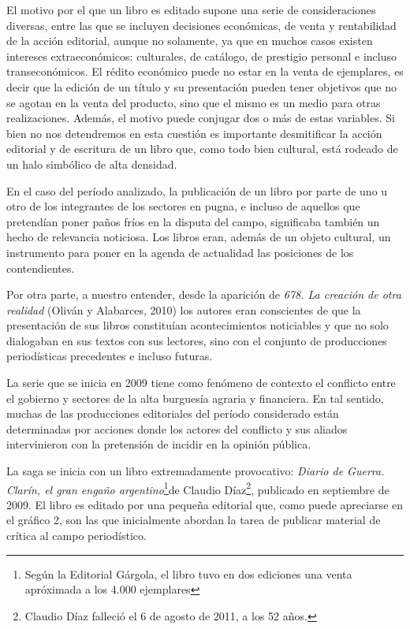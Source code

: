 {El motivo por el que un libro es editado supone una serie de consideraciones diversas, entre las que se incluyen decisiones económicas, de venta y rentabilidad de la acción editorial, aunque no solamente, ya que en muchos casos existen intereses extraeconómicos: culturales, de catálogo, de prestigio personal e incluso transeconómicos. El rédito económico puede no estar en la venta de ejemplares, es decir que la edición de un título y su presentación pueden tener objetivos que no se agotan en la venta del producto, sino que el mismo es un medio para otras realizaciones. Además, el motivo puede conjugar dos o más de estas variables. Si bien no nos detendremos en esta cuestión es importante desmitificar la acción editorial y de escritura de un libro que, como todo bien cultural, está rodeado de un halo simbólico de alta densidad.

En el caso del período analizado, la publicación de un libro por parte de uno u otro de los integrantes de los sectores en pugna, e incluso de aquellos que pretendían poner paños fríos en la disputa del campo, significaba también un hecho de relevancia noticiosa. Los libros eran, además de un objeto cultural, un instrumento para poner en la agenda de actualidad las posiciones de los contendientes.

Por otra parte, a nuestro entender, desde la aparición de \emph{678. La creación de otra realidad} (Oliván y Alabarces, 2010) los autores eran conscientes de que la presentación de sus libros constituían acontecimientos noticiables y que no solo dialogaban en sus textos con sus lectores, sino con el conjunto de producciones periodísticas precedentes e incluso futuras.

La serie que se inicia en 2009 tiene como fenómeno de contexto el conflicto entre el gobierno y sectores de la alta burguesía agraria y financiera. En tal sentido, muchas de las producciones editoriales del período considerado están determinadas por acciones donde los actores del conflicto y sus aliados intervinieron con la pretensión de incidir en la opinión pública.

La saga se inicia con un libro extremadamente provocativo: \emph{Diario de Guerra. Clarín, el gran engaño argentino}\footnote{Según la Editorial Gárgola, el libro tuvo en dos ediciones una venta apróximada a los 4.000 ejemplares}de Claudio Díaz\footnote{Claudio Díaz falleció el 6 de agosto de 2011, a los 52 años.}, publicado en septiembre de 2009. El libro es editado por una pequeña editorial que, como puede apreciarse en el gráfico 2, son las que inicialmente abordan la tarea de publicar material de crítica al campo periodístico.

}
